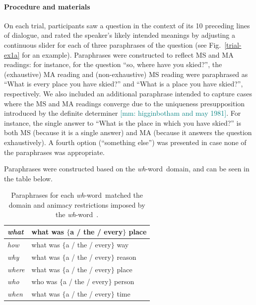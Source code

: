 \documentclass[12pt,letterpaper,table,svgnames,dvipsnames]{article}
\newcommand{\mm}[1]{\textcolor{teal}{[mm: #1]}}
\newcommand{\figref}[1]{Fig.~\ref{#1}}
\newcommand{\whw}{\emph{wh}-word~}
\begin{document}
\paragraph{Procedure and materials}
On each trial, participants saw a  question in the context of its 10 preceding lines of dialogue, and rated  the speaker's likely intended meanings by adjusting a continuous slider for each of three paraphrases of the question (see \figref{trial-ex1a} for an example).  Paraphrases were constructed to reflect MS and MA readings: for instance, for the question ``so, where have you skied?'', the (exhaustive) MA reading and (non-exhaustive) MS reading were paraphrased as ``What is every place you have skied?'' and ``What is a place you have skied?'', respectively. We also included an additional paraphrase intended to capture cases where the MS and MA readings converge due to the uniqueness presupposition introduced by the definite determiner \cite{dayal1996}\mm{higginbotham and may 1981}. For instance, the single answer to ``What is the place in which you have skied?'' is both MS (because it is a single answer) and MA (because it answers the question exhaustively). A fourth option (``something else'') was presented in case none of the paraphrases was appropriate. 

Paraphrases were constructed based on the \whw domain, and can be seen in the table below.

\begin{table}[h!]
    \centering
    \begin{tabular}{|l|l|}
    \hline
    \emph{what}     &  what was $\{$a / the / every$\}$ place\\
    \hline
    \emph{how}      & what was $\{$a / the / every$\}$ way \\
    \hline
    \emph{why}      & what was $\{$a / the / every$\}$ reason\\
    \hline
    \emph{where}    & what was $\{$a / the / every$\}$ place \\
    \hline
    \emph{who}      & who was $\{$a / the / every$\}$ person \\
    \hline
    \emph{when}     & what was $\{$a / the / every$\}$ time \\
    \hline
    \end{tabular}
    \caption{Paraphrases for each \whw matched the domain and animacy restrictions imposed by the \whw$\!$. }
    \label{tab:my_label}
\end{table}
\end{document}
